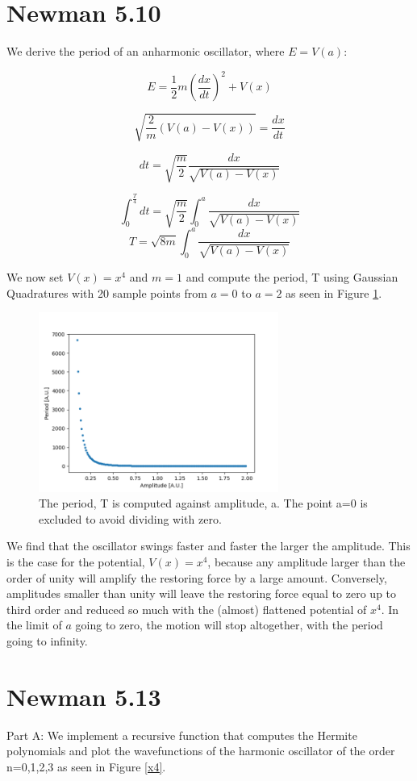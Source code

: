 \documentclass[11pt]{article}
\begin{document}
\section{Newman 5.10}
We derive the period of an anharmonic oscillator, where $E=V(a)$:

$$E=\frac{1}{2}m (\frac{dx}{dt})^2+V(x)$$

$$\sqrt{\frac{2}{m}(V(a)-V(x))}=\frac{dx}{dt}$$

$$dt=\sqrt{\frac{m}{2}}\frac{dx}{\sqrt{V(a)-V(x)}}$$

$$\int_{0}^{\frac{T}{4}}dt=\sqrt{\frac{m}{2}}\int_{0}^{a}\frac{dx}{\sqrt{V(a)-V(x)}}$$
$$T=\sqrt{8m}\int_{0}^{a}\frac{dx}{\sqrt{V(a)-V(x)}}$$

We now set $V(x)=x^4$ and $m=1$ and compute the period, T using Gaussian Quadratures with 20 sample points from $a=0$ to $a=2$ as seen in Figure \ref{Period}.

\begin{figure}[!htbp]
    \centering
    \includegraphics[width=0.7\textwidth]{Periods.png}
    \caption{The period, T is computed against amplitude, a. The point a=0 is excluded to avoid dividing with zero.}
    \label{Period}
\end{figure}

We find that the oscillator swings faster and faster the larger the amplitude. This is the case for the potential, $V(x)=x^4$, because any amplitude larger than the order of unity will amplify the restoring force by a large amount. Conversely, amplitudes smaller than unity will leave the restoring force equal to zero up to third order and reduced so much with the (almost) flattened potential of $x^4$. In the limit of $a$ going to zero, the motion will stop altogether, with the period going to infinity.  

\section{Newman 5.13}
Part A: We implement a recursive function that computes the Hermite polynomials and plot the wavefunctions of the harmonic oscillator of the order n=0,1,2,3 as seen in Figure \ref{x4}.
\end{document}
